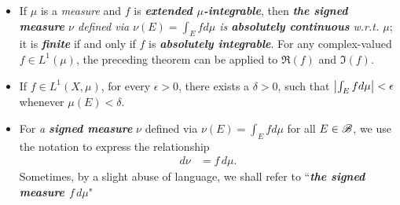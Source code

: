 \documentclass[11pt]{article}
\begin{document}
\begin{itemize}
\begin{proof}
"$\Leftarrow$", it is clear. 

"$\Rightarrow$", if the $\epsilon-\delta$ condition is not satisfied, there exists $\epsilon>0$, for all $n\in \bN$ we can find $E_{n}\in \srB$, with $\mu(E_{n})< \frac{1}{2^{n}}$ and $\nu(E_{n})\ge \epsilon$. 

Let $F_{k}= \bigcup_{n=k}^{\infty}E_{n}$ and $F = \bigcap_{k\ge 1}F_{k}$. Then $\mu\paren{F_{k}}\le \sum_{n=k}^{\infty}\frac{1}{2^{n}}= 2^{1-k}$, so $\mu(F) = 0$. But $\nu(F_{k})\ge \epsilon$ for all $k$, and hence since $\nu$ is finite, $\nu(F)=\lim\limits_{k\rightarrow \infty}\nu(F_{k}) \ge \epsilon $. Thus it is false that $\nu \ll \mu$. \qed
\end{proof}


\item \begin{remark}
 If $\mu$ is a \emph{measure} and $f$ is \emph{\textbf{extended $\mu$-integrable}}, then \emph{\textbf{the signed measure} $\nu$ defined via $\nu(E) = \int_{E}f d\mu$ is \textbf{absolutely continuous} w.r.t. $\mu$}; it is \emph{\textbf{finite}} if and only if $f$ is \emph{\textbf{absolutely integrable}}.  For any complex-valued $f \in L^1(\mu)$, the preceding theorem can be applied to $\Re(f)$ and $\Im(f)$.
 \end{remark}
 
 \item \begin{corollary}
If $f\in L^{1}(X, \mu)$, for every $\epsilon>0$, there exists a $\delta>0$, such that $\left\lvert \int_{E}f d\mu  \right\rvert<\epsilon$ whenever $\mu(E)<\delta$.
\end{corollary}
 
\item \begin{definition} 
For \emph{a \textbf{signed measure}}  $\nu$ defined via $\nu(E) = \int_{E}f d\mu$ for all $E \in {\mathscr B}$, we use the notation to express the relationship
 \begin{align*}
d\nu &= f\, d\mu.
\end{align*} Sometimes, by a slight abuse of language, we shall refer to ``\emph{\textbf{the signed measure $f\, d\mu$}}" 
\end{definition} 
 

\end{itemize}
\end{document}
